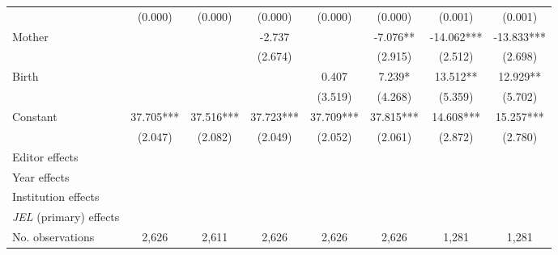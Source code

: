 \begin{table}
\begin{adjustwidth}{-0.085cm}{}
\begin{threeparttable}
\begin{tabular}{p{2.64cm}SSSSSSS}
                                          &     (0.000)   &     (0.000)   &     (0.000)   &     (0.000)   &     (0.000)   &     (0.001)   &     (0.001)   \\
            Mother                        &               &               &      -2.737   &               &      -7.076** &     -14.062***&     -13.833***\\
                                          &               &               &     (2.674)   &               &     (2.915)   &     (2.512)   &     (2.698)   \\
            Birth                         &               &               &               &       0.407   &       7.239*  &      13.512** &      12.929** \\
                                          &               &               &               &     (3.519)   &     (4.268)   &     (5.359)   &     (5.702)   \\
            Constant                      &      37.705***&      37.516***&      37.723***&      37.709***&      37.815***&      14.608***&      15.257***\\
                                          &     (2.047)   &     (2.082)   &     (2.049)   &     (2.052)   &     (2.061)   &     (2.872)   &     (2.780)   \\
            \midrule
            Editor effects                &           {}   &           {}   &           {}   &           {}   &           {}   &           {}   &           {}   \\
            Year effects                  &           {}   &           {}   &           {}   &           {}   &           {}   &           {}   &           {}   \\
            Institution effects           &           {}   &           {}   &           {}   &           {}   &           {}   &           {}   &           {}   \\
            \textit{JEL} (primary) effects&               &               &               &               &               &               &           {}   \\
            No. observations              &       2,626   &       2,611   &       2,626   &       2,626   &       2,626   &       1,281   &       1,281   \\

\end{tabular}
\end{threeparttable}
\end{adjustwidth}
\end{table}

